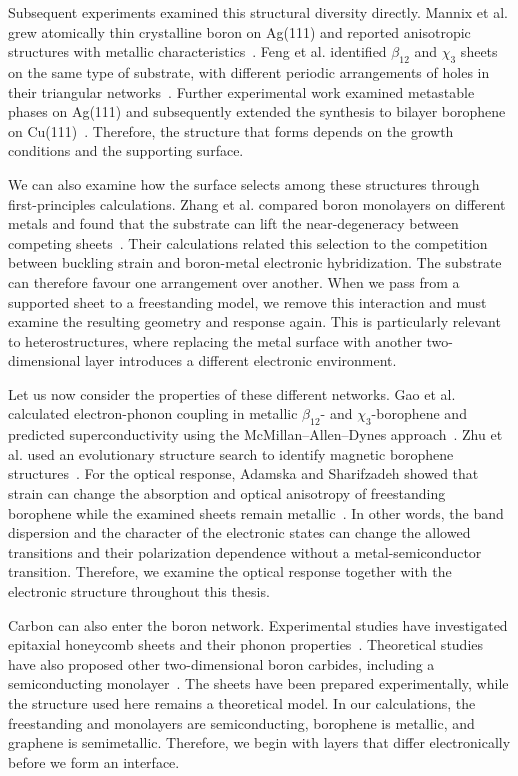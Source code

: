 Subsequent experiments examined this structural diversity directly.
Mannix et al. grew atomically thin crystalline boron on Ag(111) and reported anisotropic structures with metallic characteristics~\cite{mannix2015synthesis}.
Feng et al. identified $\beta_{12}$ and $\chi_3$ sheets on the same type of substrate, with different periodic arrangements of holes in their triangular networks~\cite{feng2016experimental}.
Further experimental work examined metastable phases on Ag(111) and subsequently extended the synthesis to bilayer borophene on Cu(111)~\cite{zhong2017metastable,chen2022synthesis}.
Therefore, the structure that forms depends on the growth conditions and the supporting surface.

We can also examine how the surface selects among these structures through first-principles calculations.
Zhang et al. compared boron monolayers on different metals and found that the substrate can lift the near-degeneracy between competing sheets~\cite{zhang2015monolayers}.
Their calculations related this selection to the competition between buckling strain and boron-metal electronic hybridization.
The substrate can therefore favour one arrangement over another.
When we pass from a supported sheet to a freestanding model, we remove this interaction and must examine the resulting geometry and response again.
This is particularly relevant to heterostructures, where replacing the metal surface with another two-dimensional layer introduces a different electronic environment.

Let us now consider the properties of these different networks.
Gao et al. calculated electron-phonon coupling in metallic $\beta_{12}$- and $\chi_3$-borophene and predicted superconductivity using the McMillan--Allen--Dynes approach~\cite{gao2017prediction}.
Zhu et al. used an evolutionary structure search to identify magnetic borophene structures~\cite{zhu2019magnetic}.
For the optical response, Adamska and Sharifzadeh showed that strain can change the absorption and optical anisotropy of freestanding borophene while the examined sheets remain metallic~\cite{adamska2017}.
In other words, the band dispersion and the character of the electronic states can change the allowed transitions and their polarization dependence without a metal-semiconductor transition.
Therefore, we examine the optical response together with the electronic structure throughout this thesis.

Carbon can also enter the boron network.
Experimental studies have investigated epitaxial  honeycomb sheets and their phonon properties~\cite{yanagisawa2004phonon,tanaka2005novel,yanagisawa2006phonon}.
Theoretical studies have also proposed other two-dimensional boron carbides, including a semiconducting  monolayer~\cite{tian2019}.
The  sheets have been prepared experimentally, while the  structure used here remains a theoretical model.
In our calculations, the freestanding  and  monolayers are semiconducting, borophene is metallic, and graphene is semimetallic.
Therefore, we begin with layers that differ electronically before we form an interface.

